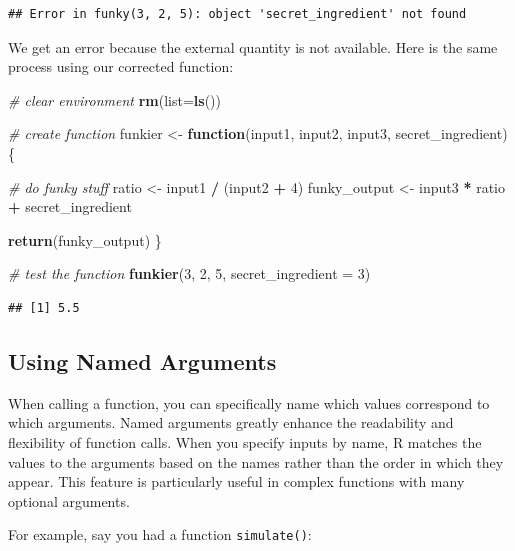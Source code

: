 \documentclass[
]{book}
\newenvironment{Shaded}{\begin{snugshade}}{\end{snugshade}}
\newcommand{\AttributeTok}[1]{\textcolor[rgb]{0.13,0.29,0.53}{#1}}
\newcommand{\CommentTok}[1]{\textcolor[rgb]{0.56,0.35,0.01}{\textit{#1}}}
\newcommand{\ControlFlowTok}[1]{\textcolor[rgb]{0.13,0.29,0.53}{\textbf{#1}}}
\newcommand{\DecValTok}[1]{\textcolor[rgb]{0.00,0.00,0.81}{#1}}
\newcommand{\FunctionTok}[1]{\textcolor[rgb]{0.13,0.29,0.53}{\textbf{#1}}}
\newcommand{\NormalTok}[1]{#1}
\newcommand{\OtherTok}[1]{\textcolor[rgb]{0.56,0.35,0.01}{#1}}
\newcommand{\SpecialCharTok}[1]{\textcolor[rgb]{0.81,0.36,0.00}{\textbf{#1}}}
\begin{document}
\begin{verbatim}
## Error in funky(3, 2, 5): object 'secret_ingredient' not found
\end{verbatim}

We get an error because the external quantity is not available.
Here is the same process using our corrected function:

\begin{Shaded}
\begin{Highlighting}[]
\CommentTok{\# clear environment}
\FunctionTok{rm}\NormalTok{(}\AttributeTok{list=}\FunctionTok{ls}\NormalTok{()) }

\CommentTok{\# create function}
\NormalTok{funkier }\OtherTok{\textless{}{-}} \ControlFlowTok{function}\NormalTok{(input1, input2, input3, secret\_ingredient) \{}
  
  \CommentTok{\# do funky stuff}
\NormalTok{  ratio }\OtherTok{\textless{}{-}}\NormalTok{ input1 }\SpecialCharTok{/}\NormalTok{ (input2 }\SpecialCharTok{+} \DecValTok{4}\NormalTok{)}
\NormalTok{  funky\_output }\OtherTok{\textless{}{-}}\NormalTok{ input3 }\SpecialCharTok{*}\NormalTok{ ratio }\SpecialCharTok{+}\NormalTok{ secret\_ingredient}
  
  \FunctionTok{return}\NormalTok{(funky\_output)  }
\NormalTok{\}}


\CommentTok{\# test the function}
\FunctionTok{funkier}\NormalTok{(}\DecValTok{3}\NormalTok{, }\DecValTok{2}\NormalTok{, }\DecValTok{5}\NormalTok{, }\AttributeTok{secret\_ingredient =} \DecValTok{3}\NormalTok{)}
\end{Highlighting}
\end{Shaded}

\begin{verbatim}
## [1] 5.5
\end{verbatim}

\subsection{Using Named Arguments}\label{using-named-arguments}

When calling a function, you can specifically name which values correspond to which arguments.
Named arguments greatly enhance the readability and flexibility of function calls.
When you specify inputs by name, R matches the values to the arguments based on the names rather than the order in which they appear.
This feature is particularly useful in complex functions with many optional arguments.

For example, say you had a function \texttt{simulate()}:
\end{document}
